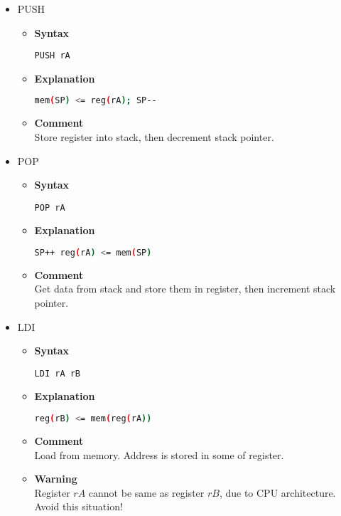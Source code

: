 \begin{itemize}
    \item PUSH
    \begin{itemize}
        \item \textbf{Syntax}
        \begin{lstlisting}[language={[markII]Assembler}, frame=single]
    PUSH rA
        \end{lstlisting}
        \item \textbf{Explanation}
        \begin{lstlisting}[language=bash, frame=single]
    mem(SP) <= reg(rA); SP--
        \end{lstlisting}
        \item \textbf{Comment} \\
    Store register into stack, then decrement stack pointer.
    \end{itemize}

    \item POP
    \begin{itemize}
        \item \textbf{Syntax}
        \begin{lstlisting}[language={[markII]Assembler}, frame=single]
    POP rA
        \end{lstlisting}
        \item \textbf{Explanation}
        \begin{lstlisting}[language=bash, frame=single]
    SP++ reg(rA) <= mem(SP)
        \end{lstlisting}
        \item \textbf{Comment} \\
    Get data from stack and store them in register, then increment stack pointer.
    \end{itemize}

    \item LDI
    \begin{itemize}
        \item \textbf{Syntax}
        \begin{lstlisting}[language={[markII]Assembler}, frame=single]
    LDI rA rB
        \end{lstlisting}
        \item \textbf{Explanation}
        \begin{lstlisting}[language=bash, frame=single]
    reg(rB) <= mem(reg(rA))
        \end{lstlisting}
        \item \textbf{Comment} \\
    Load from memory. Address is stored in some of register.
        \item \textbf{Warning} \\
    Register $rA$ cannot be same as register $rB$, due to CPU architecture. Avoid this situation!
    \end{itemize}


\end{itemize}
